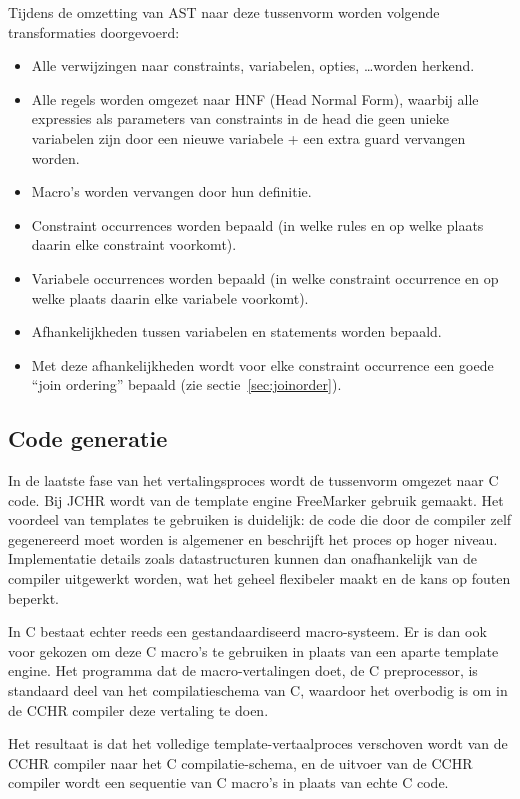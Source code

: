 Tijdens de omzetting van AST naar deze tussenvorm worden volgende transformaties doorgevoerd: \begin{itemize}
\item Alle verwijzingen naar constraints, variabelen, opties, \ldots worden herkend.
\item Alle regels worden omgezet naar HNF (Head Normal Form), waarbij alle expressies als parameters van constraints in de head die geen unieke variabelen zijn door een nieuwe variabele + een extra guard vervangen worden.
\item Macro's worden vervangen door hun definitie.
\item Constraint occurrences worden bepaald (in welke rules en op welke plaats daarin elke constraint voorkomt).
\item Variabele occurrences worden bepaald (in welke constraint occurrence en op welke plaats daarin elke variabele voorkomt).
\item Afhankelijkheden tussen variabelen en statements worden bepaald.
\item Met deze afhankelijkheden wordt voor elke constraint occurrence een goede ``join ordering'' bepaald (zie sectie~\ref{sec:joinorder}).
\end{itemize}

\subsection{Code generatie} \label{sec:codegen}

In de laatste fase van het vertalingsproces wordt de tussenvorm omgezet naar C code. Bij JCHR wordt van de template engine FreeMarker gebruik gemaakt. Het voordeel van templates te gebruiken is duidelijk: de code die door de compiler zelf gegenereerd moet worden is algemener en beschrijft het proces op hoger niveau. Implementatie details zoals datastructuren kunnen dan onafhankelijk van de compiler uitgewerkt worden, wat het geheel flexibeler maakt en de kans op fouten beperkt.

In C bestaat echter reeds een gestandaardiseerd macro-systeem. Er is dan ook voor gekozen om deze C macro's te gebruiken in plaats van een aparte template engine. Het programma dat de macro-vertalingen doet, de C preprocessor, is standaard deel van het compilatieschema van C, waardoor het overbodig is om in de CCHR compiler deze vertaling te doen.

Het resultaat is dat het volledige template-vertaalproces verschoven wordt van de CCHR compiler naar het C compilatie-schema, en de uitvoer van de CCHR compiler wordt een sequentie van C macro's in plaats van echte C code.

